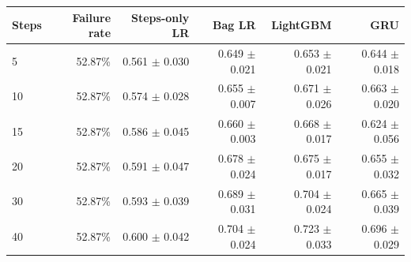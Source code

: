 \begin{tabular}{lrrrrr}
\toprule
Steps & Failure rate & Steps-only LR & Bag LR & LightGBM & GRU \\
\midrule
5 & 52.87\% & 0.561 $\pm$ 0.030 & 0.649 $\pm$ 0.021 & 0.653 $\pm$ 0.021 & 0.644 $\pm$ 0.018 \\
10 & 52.87\% & 0.574 $\pm$ 0.028 & 0.655 $\pm$ 0.007 & 0.671 $\pm$ 0.026 & 0.663 $\pm$ 0.020 \\
15 & 52.87\% & 0.586 $\pm$ 0.045 & 0.660 $\pm$ 0.003 & 0.668 $\pm$ 0.017 & 0.624 $\pm$ 0.056 \\
20 & 52.87\% & 0.591 $\pm$ 0.047 & 0.678 $\pm$ 0.024 & 0.675 $\pm$ 0.017 & 0.655 $\pm$ 0.032 \\
30 & 52.87\% & 0.593 $\pm$ 0.039 & 0.689 $\pm$ 0.031 & 0.704 $\pm$ 0.024 & 0.665 $\pm$ 0.039 \\
40 & 52.87\% & 0.600 $\pm$ 0.042 & 0.704 $\pm$ 0.024 & 0.723 $\pm$ 0.033 & 0.696 $\pm$ 0.029 \\
\bottomrule
\end{tabular}
